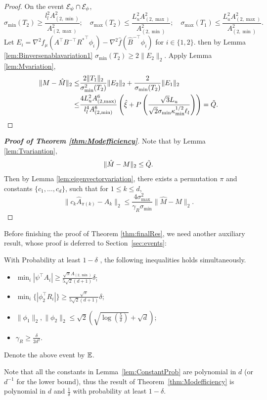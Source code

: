 \begin{proof}
On the event $\mathcal{E}_{\psi}\cap\mathcal{E}_{\phi}$,
\[
\sigma_{\min}(T_2) \ge \frac{l_l^2A^2_{(2,\min)}}{A^2_{(2,\max)}}; \quad \sigma_{\max}(T_2) \le \frac{L_u^2A^2_{(2,\max)}}{A^2_{(2,\min)}};  \quad \sigma_{\max}(T_1) \le \frac{L_u^2A^2_{(2,\max)}}{A^2_{(2,\min)}}. 
\]
Let $E_i = \nabla^2 f_{\mu}(A^{\top}B^{-\top}{R^*}^{\top}\phi_i) - \nabla^2 \hat{f}(\hat{B}^{-\top}\phi_i)$ for  $i\in\{1,2\}$. then by 
Lemma \ref{lem:Binversenablavariation1} $\sigma_{\min}(T_2) \ge 2\|E_2\|_2$.
Apply Lemma \ref{lem:Mvariation},
\begin{align*}
\|M - \hat{M}\|_2 \le &
\frac{2\|T_1\|_2}{\sigma^2_{\min}(T_2)}\|E_2\|_2 + \frac{2}{\sigma_{\min}(T_2)}\|E_1\|_2 \\
\le & \frac{4L_u^2A^6_{(2,\max)}}{l_l^4 A^6_{(2,\min)}}\left(\hat{\xi}
+
P\left(\frac{\sqrt{3}L_u}{\sqrt{2}\sigma_{\min}\kappa_{\min}^{1/2}\ell_l}\right)\right) = \tilde{Q}.
\end{align*}
\end{proof}
\begin{proof}[{\bf Proof of Theorem \ref{thm:Modefficiency}}]
Note that by Lemma \ref{lem:Tvariantion},
\[
\|\hat{M} - M\|_2 \le \tilde{Q}.
\]
Then by Lemma \ref{lem:eigenvectorvariation}, there exists a permutation $\pi$ and constants $\{c_1,\ldots,c_d\}$, such that for $1\le k\le d$,
\[
\| c_k\hat{A}_{\pi(k)} - A_k\|_2 \le \frac{4\sigma^2_{\max}}{\gamma_R\sigma_{\min}} \|\hat{M} - M\|_2.
\]
\end{proof}

Before finishing the proof of Theorem \ref{thm:finalRes}, we need another auxiliary result, whose proof is deferred to Section~\ref{sec:events}:
\begin{lemma}
\label{lem:ConstantProb}
With Probability at least $1-\delta$ , the following inequalities holds simultaneously.
\begin{itemize}
\vspace{-3mm}
\item $\min_i |\psi^{\top}A_i| \ge \frac{\sqrt{\pi}A_{(2,\min)}}{5\sqrt{2}(d+1)} \delta$;
\item $\min_i \{|\phi_2^{\top}R_i|\} \ge \frac{\sqrt{\pi}}{5\sqrt{2}(d+1)}\delta$;
\item $\|\phi_1\|_2, \|\phi_2\|_2 \le \sqrt{2}\left(\sqrt{\log(\frac{5}{\delta})}+\sqrt{d}\right)$;
\item $\gamma_R \ge\frac{\delta}{2d^2}$.
\end{itemize}
\vspace{-2mm}
\end{lemma}
Denote the above event by $\mathbb{E}$.
\begin{remark}
Note that all the constants in Lemma~\ref{lem:ConstantProb} are polynomial in $d$ (or $d^{-1}$ for the lower bound), thus the result of Theorem~\ref{thm:Modefficiency} is polynomial in $d$ and $\frac{1}{\delta}$ with probability at least $1-\delta$. %
\end{remark}

